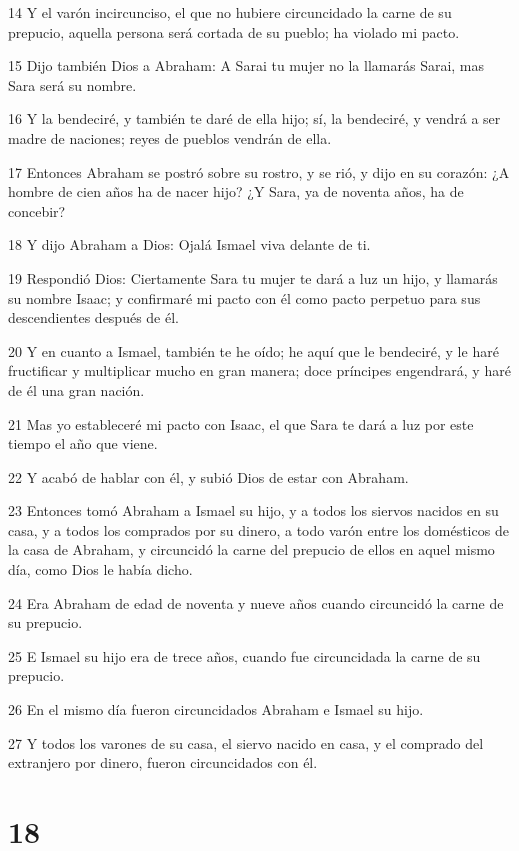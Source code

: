 \par 14 Y el varón incircunciso, el que no hubiere circuncidado la carne de su prepucio, aquella persona será cortada de su pueblo; ha violado mi pacto.
\par 15 Dijo también Dios a Abraham: A Sarai tu mujer no la llamarás Sarai, mas Sara será su nombre.
\par 16 Y la bendeciré, y también te daré de ella hijo; sí, la bendeciré, y vendrá a ser madre de naciones; reyes de pueblos vendrán de ella.
\par 17 Entonces Abraham se postró sobre su rostro, y se rió, y dijo en su corazón: ¿A hombre de cien años ha de nacer hijo? ¿Y Sara, ya de noventa años, ha de concebir?
\par 18 Y dijo Abraham a Dios: Ojalá Ismael viva delante de ti.
\par 19 Respondió Dios: Ciertamente Sara tu mujer te dará a luz un hijo, y llamarás su nombre Isaac; y confirmaré mi pacto con él como pacto perpetuo para sus descendientes después de él.
\par 20 Y en cuanto a Ismael, también te he oído; he aquí que le bendeciré, y le haré fructificar y multiplicar mucho en gran manera; doce príncipes engendrará, y haré de él una gran nación.
\par 21 Mas yo estableceré mi pacto con Isaac, el que Sara te dará a luz por este tiempo el año que viene.
\par 22 Y acabó de hablar con él, y subió Dios de estar con Abraham.
\par 23 Entonces tomó Abraham a Ismael su hijo, y a todos los siervos nacidos en su casa, y a todos los comprados por su dinero, a todo varón entre los domésticos de la casa de Abraham, y circuncidó la carne del prepucio de ellos en aquel mismo día, como Dios le había dicho.
\par 24 Era Abraham de edad de noventa y nueve años cuando circuncidó la carne de su prepucio.
\par 25 E Ismael su hijo era de trece años, cuando fue circuncidada la carne de su prepucio.
\par 26 En el mismo día fueron circuncidados Abraham e Ismael su hijo.
\par 27 Y todos los varones de su casa, el siervo nacido en casa, y el comprado del extranjero por dinero, fueron circuncidados con él.

\chapter{18}

